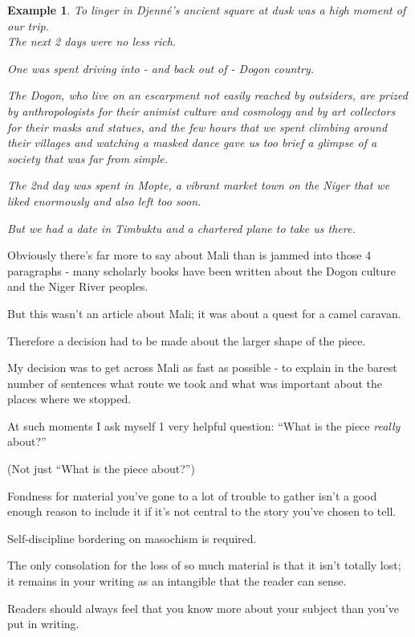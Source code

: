 \documentclass{book}
\numberwithin{equation}{section}
\newtheorem{example}{Example}[chapter]
\begin{document}
\begin{example}
    To linger in Djenn\'e's ancient square at dusk was a high moment of our trip.
    \\
    
    The next 2 days were no less rich.
    
    One was spent driving into - and back out of - Dogon country.
    
    The Dogon, who live on an escarpment not easily reached by outsiders, are prized by anthropologists for their animist culture and cosmology and by art collectors for their masks and statues, and the few hours that we spent climbing around their villages and watching a masked dance gave us too brief a glimpse of a society that was far from simple.
    
    The 2nd day was spent in Mopte, a vibrant market town on the Niger that we liked enormously and also left too soon.
    
    But we had a date in Timbuktu and a chartered plane to take us there.
\end{example}
Obviously there's far more to say about Mali than is jammed into those 4 paragraphs - many scholarly books have been written about the Dogon culture and the Niger River peoples.

But this wasn't an article about Mali; it was about a quest for a camel caravan.

Therefore a decision had to be made about the larger shape of the piece.

My decision was to get across Mali as fast as possible - to explain in the barest number of sentences what route we took and what was important about the places where we stopped.

%
At such moments I ask myself 1 very helpful question: ``What is the piece \textit{really} about?''

(Not just ``What is the piece about?'')

Fondness for material you've gone to a lot of trouble to gather isn't a good enough reason to include it if it's not central to the story you've chosen to tell.

Self-discipline bordering on masochism is required.

The only consolation for the loss of so much material is that it isn't totally lost; it remains in your writing as an intangible that the reader can sense.

Readers should always feel that you know more about your subject than you've put in writing.
\end{document}
